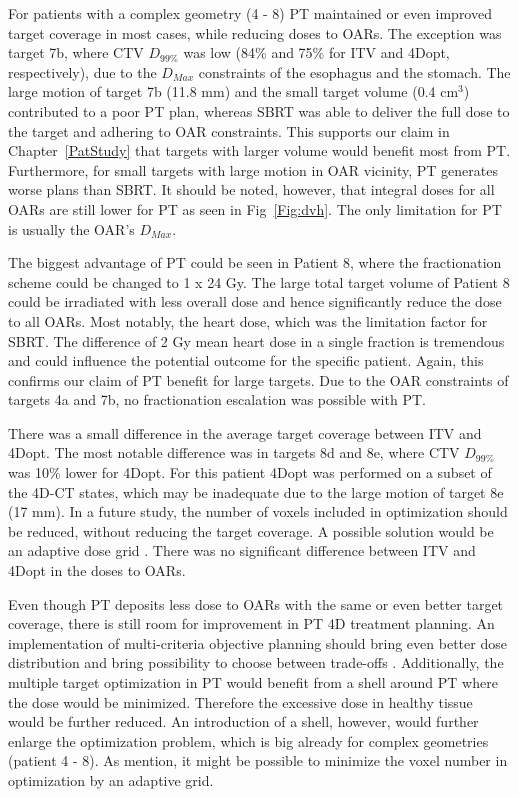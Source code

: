 For patients with a complex geometry (4 - 8) PT maintained or even improved target coverage in most cases, while reducing doses to OARs.
The exception was target 7b, where CTV $D_{99\%}$ was low (84\% and 75\% for ITV and 4Dopt, respectively), due to the $D_{Max}$ constraints of the esophagus and the stomach.
The large motion of target 7b (11.8 mm) and the small target volume (0.4 cm$^3$) contributed to a poor PT plan, whereas SBRT was able to deliver the full dose to the target
and adhering to OAR constraints. This supports our claim in Chapter~\ref{PatStudy} that targets with larger volume would benefit most from PT. Furthermore, for small targets
with large motion in OAR vicinity, PT generates worse plans than SBRT. It should be noted, however, that integral doses for all OARs are still lower for PT as seen in Fig~\ref{Fig:dvh}.
The only limitation for PT is usually the OAR's $D_{Max}$.

The biggest advantage of PT could be seen in Patient 8, where the fractionation scheme could be changed to 1 x 24 Gy. 
The large total target volume of Patient 8 could be irradiated with less overall dose and hence significantly reduce the dose to all OARs. Most notably, the heart dose,
which was the limitation factor for SBRT. The difference of 2 Gy mean heart dose in a single fraction is tremendous and could influence the potential outcome for the specific patient.
Again, this confirms our claim of PT benefit for large targets.
Due to the OAR constraints of targets 4a and 7b, no fractionation escalation was possible with PT. 

There was a small difference in the average target coverage between ITV and 4Dopt. The most notable difference was in targets 8d and 8e, where CTV $D_{99\%}$ was 10\% lower
for 4Dopt. For this patient 4Dopt was performed on a subset of the  4D-CT states, which may be inadequate due to the large motion of target 8e (17 mm). In a future study,
the number of voxels included in optimization should be reduced, without reducing the target coverage. A possible solution would be an adaptive dose grid \cite{Prall2016a}.
There was no significant difference between ITV and 4Dopt in the doses to OARs. 


Even though PT deposits less dose to OARs with the same or even better target coverage, there is still room for improvement in PT 4D treatment planning. 
An implementation of multi-criteria objective planning should bring even better dose distribution and bring possibility to choose between trade-offs \cite{Breedveld2007, Chen2010}. 
Additionally, the multiple target optimization in PT would benefit from a shell around PT where the dose would be minimized. Therefore the excessive dose
in healthy tissue would be further reduced. An introduction of a shell, however, would further enlarge the optimization problem, which is big already for complex geometries 
(patient 4 - 8). As mention, it might be possible to minimize the voxel number in optimization by an adaptive grid.

